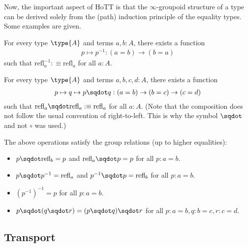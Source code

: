     Now, the important aspect of HoTT is that the $\infty$-groupoid structure of a type can be derived solely from the (path) induction principle of the equality types. Some examples are given.
    \begin{property}[Inversion]
        For every type $\type{A}$ and terms $a,b:A$, there exists a function
        \begin{gather}
            p\mapsto p^{-1}:(a=b)\rightarrow(b=a)
        \end{gather}
        such that $\mathrm{refl}_a^{-1}:\equiv\mathrm{refl}_a$ for all $a:A$.
    \end{property}
    \begin{property}[Concatenation]
        For every type $\type{A}$ and terms $a,b,c,d:A$, there exists a function
        \begin{gather}
            p\mapsto q\mapsto p\sqdot q:(a=b)\rightarrow(b=c)\rightarrow(c=d)
        \end{gather}
        such that $\mathrm{refl}_a\sqdot\mathrm{refl}_a:\equiv\mathrm{refl}_a$ for all $a:A$. (Note that the composition does not follow the usual convention of right-to-left. This is why the symbol $\sqdot$ and not $\circ$ was used.)
    \end{property}
    \begin{property}
        The above operations satisfy the group relations (up to higher equalities):
        \begin{itemize}
            \item $p\sqdot\mathrm{refl}_b=p$ and $\mathrm{refl}_a\sqdot p=p$ for all $p:a=b$.
            \item $p\sqdot p^{-1}=\mathrm{refl}_a$ and $p^{-1}\sqdot p=\mathrm{refl}_b$ for all $p:a=b$.
            \item $(p^{-1})^{-1}=p$ for all $p:a=b$.
            \item $p\sqdot(q\sqdot r) = (p\sqdot q)\sqdot r$ for all $p:a=b, q:b=c, r:c=d$.
        \end{itemize}
    \end{property}

\subsection{Transport}


